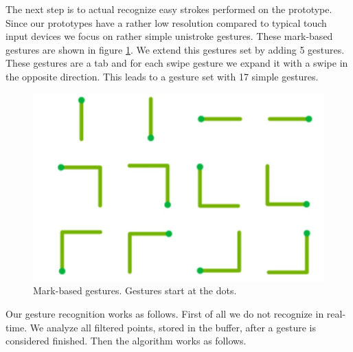 The next step is to actual recognize easy strokes performed on the prototype.  Since our prototypes have a rather low resolution compared to typical touch input devices we focus on rather simple unistroke gestures. These mark-based gestures are shown in figure \ref{fig:markBasedGestures}. We extend this gestures set by adding 5 gestures. These gestures are a tab and for each swipe gesture we expand it with a swipe in the opposite direction. This leads to a gesture set with 17 simple gestures. \\
 \begin{figure}
 \includegraphics[scale=0.25]{images/markBasedGestures.jpg}
 \caption{Mark-based gestures. Gestures start at the dots. \cite{Bragdon}}
 \label{fig:markBasedGestures}
 \end{figure}
Our gesture recognition works as follows. First of all we do not recognize in real-time. We analyze all filtered points, stored in the buffer, after a gesture is considered finished.  Then the algorithm works as follows.
